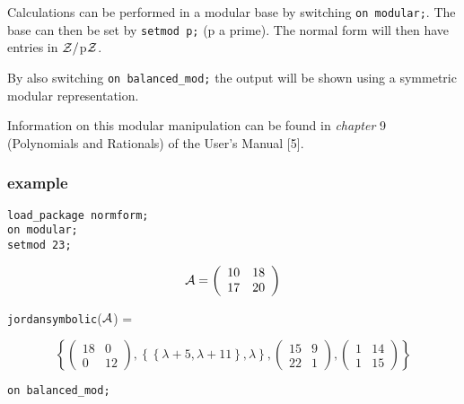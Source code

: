 Calculations can be performed in a modular base by switching {\tt on 
modular;}. The base can then be set by {\tt setmod p;} (p a prime). The 
normal form will then have entries in ${\cal Z}/$p${\cal Z}$. 

By also switching {\tt on balanced\_mod;} the output will be shown using
a symmetric modular representation. 

Information on this modular manipulation can be found in {\it chapter} 
9 (Polynomials and Rationals) of the {\REDUCE}  User's Manual [5].

\subsubsection{example}

{\tt load\_package normform;} \\
{\tt on modular;} \\
{\tt setmod 23;} 
\vspace{0.1in}

\begin{displaymath}
{\cal A} = \left( \begin{array}{cc} 10 & 18 \\ 17 & 20 \end{array} 
\right)
\end{displaymath}

{\tt jordansymbolic}(${\cal A}$) = 
\begin{center}
\begin{displaymath}
\left\{ \left( \begin{array}{cc} 18 & 0 \\ 0 & 12 \end{array} \right),
\left\{ \left\{ \lambda + 5, \lambda + 11  \right\}, \lambda \right\}, 
\left( \begin{array}{cc} 15 & 9 \\ 22 & 1 \end{array} \right), \left( 
\begin{array}{cc} 1 & 14 \\ 1 & 15 \end{array} \right) \right\}
\end{displaymath}
\end{center}
\vspace{0.2in}

{\tt on balanced\_mod;}
\vspace{0.2in}

